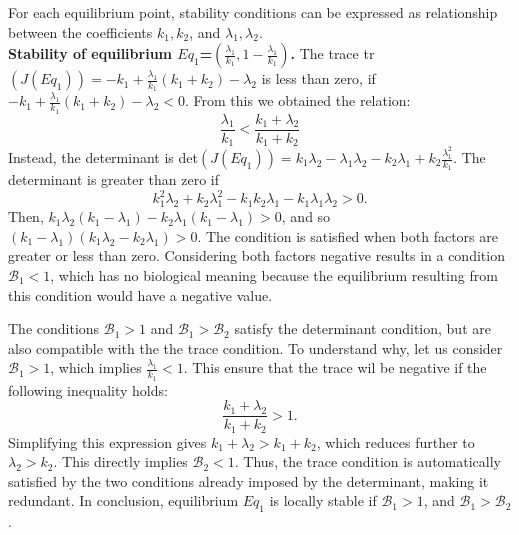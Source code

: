 For each equilibrium point, stability conditions can be expressed as relationship between the coefficients $k_1, k_2$, and $\lambda_1, \lambda_2$.\\

\noindent\textbf{Stability of equilibrium $Eq_1$=$(\frac{\lambda_1}{k_1}, 1-\frac{\lambda_1}{k_1})$.} The trace tr$(J(Eq_1)) = - k_1 + \frac{\lambda_1}{k_1}(k_1+k_2) - \lambda_2$ is  less than zero, if $-k_1 + \frac{\lambda_1}{k_1}( k_1 + k_2) - \lambda_2 < 0$. From this we obtained the relation:
\[\frac{\lambda_1}{k_1} < \frac{k_1 + \lambda_2}{k_1 + k_2} \]
Instead, the determinant is det$(J(Eq_1)) = k_1 \lambda_2 - \lambda_1 \lambda_2 -k_2 \lambda_1 + k_2 \frac{\lambda_1^2}{k_1}$. The determinant is greater than zero if
 \[ k_1^2 \lambda_2+ k_2 \lambda_1^2 - k_1 k_2 \lambda_1 -k_1 \lambda_1 \lambda_2 > 0.\]
  Then, $k_1 \lambda_2(k_1 -\lambda_1) - k_2 \lambda_1 (k_1 - \lambda_1) > 0$, and so $(k_1 - \lambda_1)(k_1 \lambda_2 - k_2 \lambda_1) > 0$. The condition is satisfied when both factors are greater or less than zero. Considering both factors negative results in a condition $\mathcal{B}_1 < 1$, which has no biological meaning because the equilibrium resulting from this condition would have a negative value.

The conditions $\mathcal{B}_1 > 1$ and $\mathcal{B}_1 > \mathcal{B}_2$ satisfy the determinant condition, but are also compatible with the the trace condition.
To understand why, let us consider $\mathcal{B}_1 > 1$, which implies $\frac{\lambda_1}{k_1} < 1$. This ensure that the trace wil be negative if the following inequality holds:
\[\frac{k_1 + \lambda_2}{k_1 + k_2} > 1.\] 
Simplifying this expression gives $k_1 + \lambda_2 > k_1 + k_2$, which reduces further to  $\lambda_2 > k_2$. This directly implies $\mathcal{B}_2 < 1$. Thus, the trace condition is automatically satisfied by the two conditions already imposed by the determinant, making it redundant.
In conclusion, equilibrium $Eq_1$ is locally stable if $\mathcal{B}_1 > 1$, and $\mathcal{B}_1 > \mathcal{B}_2$.
\\ 
 

